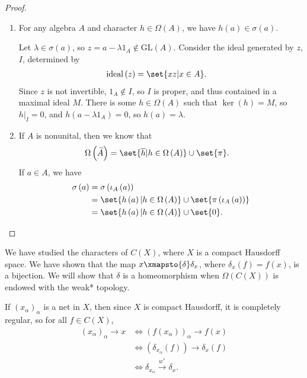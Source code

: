 \documentclass[10pt]{mypackage}
\newcommand{\GL}{\text{GL}}
\begin{document}
\begin{proof}\hfill
  \begin{enumerate}[(1)]
    \item For any algebra $A$ and character $h\in \Omega\left(A\right)$, we have $h\left(a\right)\in \sigma\left(a\right)$.\newline

      Let $\lambda\in \sigma\left(a\right)$, so $z = a-\lambda 1_A \notin \GL\left(A\right)$. Consider the ideal generated by $z$, $I$, determined by
      \begin{align*}
        \operatorname{ideal}\left(z\right) &= \set{xz | x\in A}.
      \end{align*}
      Since $z$ is not invertible, $1_A\notin I$, so $I$ is proper, and thus contained in a maximal ideal $M$. There is some $h\in \Omega\left(A\right)$ such that $\ker\left(h\right) = M$, so $h|_{I} = 0$, and $h\left(a-\lambda 1_A\right) = 0$, so $h\left(a\right) = \lambda$.
    \item If $A$ is nonunital, then we know that
      \begin{align*}
        \Omega\left(\widetilde{A}\right) &= \set{\overline{h} | h\in \Omega\left(A\right)} \cup \set{\pi}.
      \end{align*}
      If $a\in A$, we have
      \begin{align*}
        \sigma\left(a\right) &= \sigma\left(\iota_A\left(a\right)\right)\\
                             &= \set{h\left(a\right) | h\in \Omega\left(A\right)} \cup \set{\pi\left(\iota_A\left(a\right)\right)}\\
                             &= \set{h\left(a\right) | h\in \Omega\left(A\right)} \cup \set{0}.
      \end{align*}
  \end{enumerate}
\end{proof}
\begin{example}
  We have studied the characters of $C(X)$, where $X$ is a compact Hausdorff space. We have shown that the map $x\xmapsto{\delta}\delta_x$, where $\delta_x\left(f\right) = f(x)$, is a bijection. We will show that $\delta$ is a homeomorphism when $\Omega\left(C(X)\right)$ is endowed with the weak* topology.\newline

  If $\left(x_{\alpha}\right)_{\alpha}$ is a net in $X$, then since $X$ is compact Hausdorff, it is completely regular, so for all $f\in C(X)$,
  \begin{align*}
    \left(x_{\alpha}\right)_{\alpha}\rightarrow x &\Leftrightarrow \left(f\left(x_{\alpha}\right)\right)_{\alpha}\rightarrow f\left(x\right)\\
                                                  &\Leftrightarrow \left(\delta_{x_{\alpha}}\left(f\right)\right)\rightarrow \delta_{x}\left(f\right)\\
                                                  &\Leftrightarrow \delta_{x_{\alpha}}\xrightarrow{w^{\ast}}\delta_{x}.
  \end{align*}
\end{example}
\end{document}
